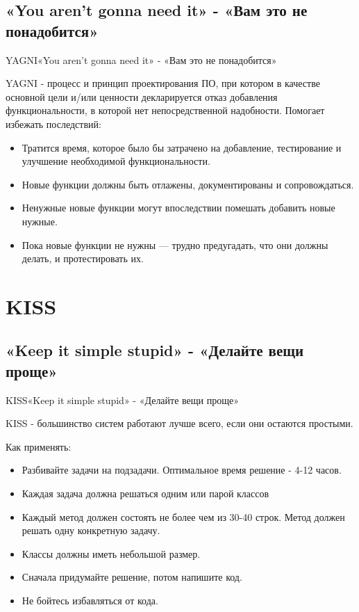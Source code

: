 \documentclass[10pt]{beamer}
\begin{document}
\subsection{«You aren't gonna need it» - «Вам это не понадобится»}
\begin{frame}[fragile]{YAGNI}{«You aren't gonna need it» - «Вам это не понадобится»}

YAGNI - процесс и принцип проектирования ПО, при котором в качестве основной цели и/или ценности декларируется отказ добавления функциональности, в которой нет непосредственной надобности.
Помогает избежать последствий:
    \begin{itemize}
        \item Тратится время, которое было бы затрачено на добавление, тестирование и улучшение необходимой функциональности.
        \item Новые функции должны быть отлажены, документированы и сопровождаться.
        \item Ненужные новые функции могут впоследствии помешать добавить новые нужные.
        \item Пока новые функции не нужны — трудно  предугадать, что они должны делать, и протестировать их.
    \end{itemize}
\end{frame}

\section{KISS}
\subsection{«Keep it simple stupid» - «Делайте вещи проще»}
\begin{frame}[fragile]{KISS}{«Keep it simple stupid» - «Делайте вещи проще»}

KISS - большинство систем работают лучше всего, если они остаются простыми.

Как применять:
    \begin{itemize}
        \item Разбивайте задачи на подзадачи. Оптимальное время решение - 4-12 часов.
        \item Каждая задача должна решаться одним или парой классов
        \item Каждый метод должен состоять не более чем из 30-40 строк. Метод должен решать одну конкретную задачу.
        \item Классы должны иметь небольшой размер.
        \item Сначала придумайте решение, потом напишите код. 
        \item Не бойтесь избавляться от кода.
    \end{itemize}
\end{frame}
\end{document}
